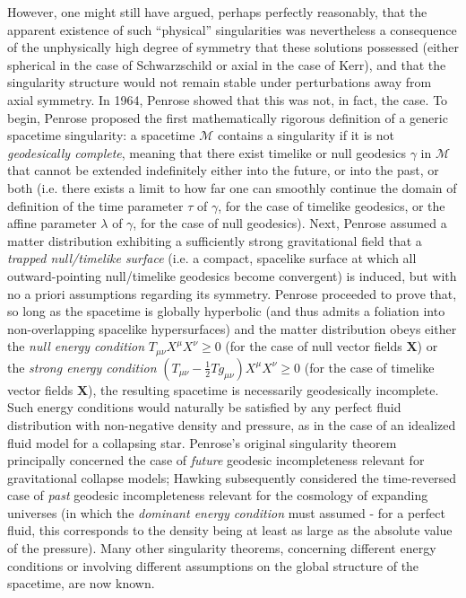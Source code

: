 \documentclass{article}
\begin{document}
However, one might still have argued, perhaps perfectly reasonably, that the apparent existence of such ``physical'' singularities was nevertheless a consequence of the unphysically high degree of symmetry that these solutions possessed (either spherical in the case of Schwarzschild or axial in the case of Kerr), and that the singularity structure would not remain stable under perturbations away from axial symmetry. In 1964, Penrose\cite{penrose} showed that this was not, in fact, the case. To begin, Penrose proposed the first mathematically rigorous definition of a generic spacetime singularity: a spacetime ${\mathcal{M}}$ contains a singularity if it is not \textit{geodesically complete}, meaning that there exist timelike or null geodesics ${\gamma}$ in ${\mathcal{M}}$ that cannot be extended indefinitely either into the future, or into the past, or both (i.e. there exists a limit to how far one can smoothly continue the domain of definition of the time parameter ${\tau}$ of ${\gamma}$, for the case of timelike geodesics, or the affine parameter ${\lambda}$ of ${\gamma}$, for the case of null geodesics). Next, Penrose assumed a matter distribution exhibiting a sufficiently strong gravitational field that a \textit{trapped null/timelike surface} (i.e. a compact, spacelike surface at which all outward-pointing null/timelike geodesics become convergent) is induced, but with no a priori assumptions regarding its symmetry. Penrose proceeded to prove that, so long as the spacetime is globally hyperbolic (and thus admits a foliation into non-overlapping spacelike hypersurfaces) and the matter distribution obeys either the \textit{null energy condition} ${T_{\mu \nu} X^{\mu} X^{\nu} \geq 0}$ (for the case of null vector fields ${\mathbf{X}}$) or the \textit{strong energy condition} ${\left( T_{\mu \nu} - \frac{1}{2} T g_{\mu \nu} \right) X^{\mu} X^{\nu} \geq 0}$ (for the case of timelike vector fields ${\mathbf{X}}$), the resulting spacetime is necessarily geodesically incomplete. Such energy conditions would naturally be satisfied by any perfect fluid distribution with non-negative density and pressure, as in the case of an idealized fluid model for a collapsing star. Penrose's original singularity theorem principally concerned the case of \textit{future} geodesic incompleteness relevant for gravitational collapse models; Hawking\cite{hawking} subsequently considered the time-reversed case of \textit{past} geodesic incompleteness relevant for the cosmology of expanding universes (in which the \textit{dominant energy condition} must assumed - for a perfect fluid, this corresponds to the density being at least as large as the absolute value of the pressure). Many other singularity theorems, concerning different energy conditions or involving different assumptions on the global structure of the spacetime, are now known.
\end{document}
